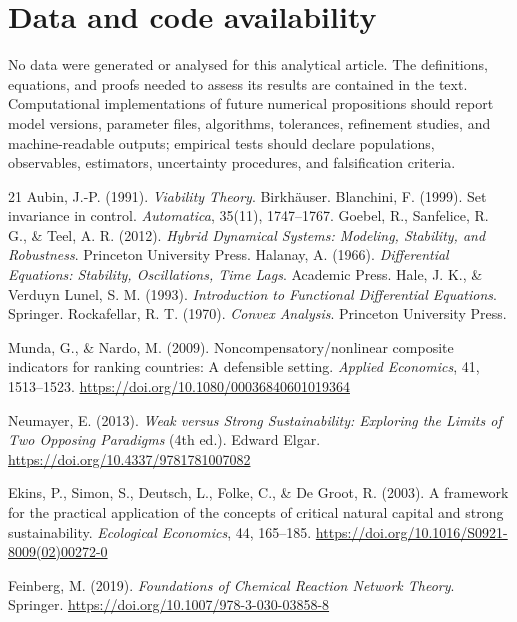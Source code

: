 \documentclass[11pt]{article}
\theoremstyle{definition}
\begin{document}
\section*{Data and code availability}
No data were generated or analysed for this analytical article. The definitions, equations, and proofs needed to assess its results are contained in the text. Computational implementations of future numerical propositions should report model versions, parameter files, algorithms, tolerances, refinement studies, and machine-readable outputs; empirical tests should declare populations, observables, estimators, uncertainty procedures, and falsification criteria.

\begin{thebibliography}{21}
 Aubin, J.-P. (1991). \textit{Viability Theory}. Birkh\"auser.
 Blanchini, F. (1999). Set invariance in control. \textit{Automatica}, 35(11), 1747--1767.
 Goebel, R., Sanfelice, R. G., \& Teel, A. R. (2012). \textit{Hybrid Dynamical Systems: Modeling, Stability, and Robustness}. Princeton University Press.
 Halanay, A. (1966). \textit{Differential Equations: Stability, Oscillations, Time Lags}. Academic Press.
 Hale, J. K., \& Verduyn Lunel, S. M. (1993). \textit{Introduction to Functional Differential Equations}. Springer.
 Rockafellar, R. T. (1970). \textit{Convex Analysis}. Princeton University Press.

 Munda, G., \& Nardo, M. (2009). Noncompensatory/nonlinear composite indicators for ranking countries: A defensible setting. \textit{Applied Economics}, 41, 1513--1523. \url{https://doi.org/10.1080/00036840601019364}

 Neumayer, E. (2013). \textit{Weak versus Strong Sustainability: Exploring the Limits of Two Opposing Paradigms} (4th ed.). Edward Elgar. \url{https://doi.org/10.4337/9781781007082}

 Ekins, P., Simon, S., Deutsch, L., Folke, C., \& De Groot, R. (2003). A framework for the practical application of the concepts of critical natural capital and strong sustainability. \textit{Ecological Economics}, 44, 165--185. \url{https://doi.org/10.1016/S0921-8009(02)00272-0}

 Feinberg, M. (2019). \textit{Foundations of Chemical Reaction Network Theory}. Springer. \url{https://doi.org/10.1007/978-3-030-03858-8}


\end{thebibliography}
\end{document}
